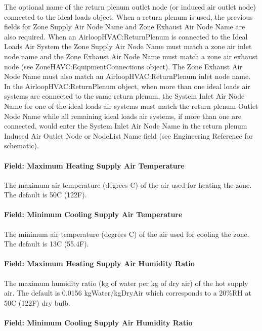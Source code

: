 The optional name of the return plenum outlet node (or induced air outlet node) connected to the ideal loads object. When a return plenum is used, the previous fields for Zone Supply Air Node Name and Zone Exhaust Air Node Name are also required. When an AirloopHVAC:ReturnPlenum is connected to the Ideal Loads Air System the Zone Supply Air Node Name must match a zone air inlet node name and the Zone Exhaust Air Node Name must match a zone air exhaust node (see ZoneHAVC:EquipmentConnections object). The Zone Exhaust Air Node Name must also match an AirloopHVAC:ReturnPlenum inlet node name. In the AirloopHVAC:ReturnPlenum object, when more than one ideal loads air systems are connected to the same return plenum, the System Inlet Air Node Name for one of the ideal loads air systems must match the return plenum Outlet Node Name while all remaining ideal loads air systems, if more than one are connected, would enter the System Inlet Air Node Name in the return plenum Induced Air Outlet Node or NodeList Name field (see Engineering Reference for schematic).

\paragraph{Field: Maximum Heating Supply Air Temperature}\label{field-maximum-heating-supply-air-temperature-000}

The maximum air temperature (degrees C) of the air used for heating the zone. The default is 50C (122F).

\paragraph{Field: Minimum Cooling Supply Air Temperature}\label{field-minimum-cooling-supply-air-temperature-000}

The minimum air temperature (degrees C) of the air used for cooling the zone. The default is 13C (55.4F).

\paragraph{Field: Maximum Heating Supply Air Humidity Ratio}\label{field-maximum-heating-supply-air-humidity-ratio-000}

The maximum humidity ratio (kg of water per kg of dry air) of the hot supply air. The default is 0.0156 kgWater/kgDryAir which corresponds to a 20\%RH at 50C (122F) dry bulb.

\paragraph{Field: Minimum Cooling Supply Air Humidity Ratio}\label{field-minimum-cooling-supply-air-humidity-ratio-000}

